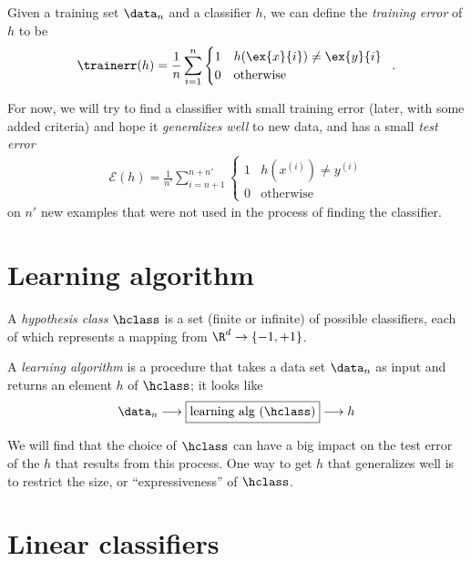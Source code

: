 Given a training set $\data_n$ and a classifier $h$, we can define the
  {\em{training error}} of $h$ to be
\begin{eqnarray*}
  \trainerr(h) = \frac{1}{n}\sum_{i = 1}^{n}\begin{cases} 1 &
              h(\ex{x}{i}) \ne \ex{y}{i} \\ 0 & \text{otherwise}\end{cases}
  \;\;.
\end{eqnarray*}

For now, we will try to find a classifier with small training error
(later, with some added criteria) and hope it {\em{generalizes well}}
to new data, and has a small {\em test error}
\begin{eqnarray*}
  \mathcal{E}(h) = \frac{1}{n'}\sum_{i = n + 1}^{n + n'}\begin{cases}
    1 & h(x^{(i)}) \ne y^{(i)} \\ 0 & \text{otherwise}\end{cases}
\end{eqnarray*}
on $n'$ new examples that were not used in the process of finding the
classifier.

\section{Learning algorithm}
A {\em hypothesis class} $\hclass$ is a set (finite or infinite) of
possible classifiers, each of which represents a mapping from
$\R^d \rightarrow \{-1, +1\}$.

A {\em learning algorithm} is a
procedure that takes a data set $\data_n$ as input and returns an
element $h$ of $\hclass$;  it looks  like
\begin{equation*}
  \data_n \longrightarrow \boxed{\text{learning alg ($\hclass$)}} \longrightarrow h
\end{equation*}

We will find that the choice of $\hclass$ can have a big impact on the
test error of the $h$ that results from this process.
One way to get $h$ that generalizes well is to restrict the size, or
``expressiveness'' of $\hclass$.

\section{Linear classifiers}

